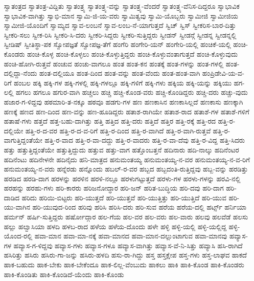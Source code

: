 {ಸ್ವಾತಂತ್ರದ
ಸ್ವಾತಂತ್ರ-ವಿದ್ದಿತು
ಸ್ವಾತಂತ್ರ್ಯ
ಸ್ವಾತಂತ್ರ್ಯ-ವನ್ನು
ಸ್ವಾತಂತ್ರ್ಯ-ವೆಂದರೆ
ಸ್ವಾತಂತ್ರ್ಯ-ವೆನಿಸ-ದಿದ್ದರೂ
ಸ್ವಾಭಾವಿಕ
ಸ್ವಾಭಾವಿಕ-ವಾಗಿತ್ತು
ಸ್ವಾಭಿ-ಮಾನ
ಸ್ವಾಮಿ-ಜಿ-ಯ-ವರು
ಸ್ವಾಮಿತ್ವವು
ಸ್ವಾಮಿ-ಯೊಬ್ಬರು
ಸ್ವಾಮೀಜಿ
ಸ್ವಾಮೀಜಿಯ
ಸ್ವಾಮೀಜಿ-ಯೊಂದಿಗೆ
ಸ್ವಾಮ್ಯದ
ಸ್ವಾವ-ಲಂಬನೆ
ಸ್ವಾವ-ಲಂಬ-ನೆ-ಯಾಗುತ್ತದೆ
ಸ್ವಿಚ್
ಸ್ವಿಸ್
ಸ್ವೀಕರಿಸ-ಬಾರ-ದಿತ್ತು
ಸ್ವೀಕರಿ-ಸಲು
ಸ್ವೀಕ-ರಿಸಿ
ಸ್ವೀಕರಿ-ಸಿ-ದರು
ಸ್ವೀಕರಿ-ಸಿದ್ದರು
ಸ್ವೀಕರಿ-ಸುತ್ತಿದ್ದರು
ಸ್ವೀಡನ್
ಸ್ವೀಡನ್ಗೆ
ಸ್ವೀಡನ್ನ
ಸ್ವೀಡನ್ನಲ್ಲಿ
ಸ್ವೀಡಿಷ್
ಸ್ವೀತಿಸ್ಥಾ-ಪಕ
ಸ್ವೋಪಜ್ಞತೆ
ಸ್ವೋಪಜ್ಞ-ತೆಗೆ
ಹಂಗೆರಿ
ಹಂಗೇರಿ-ಯನ್
ಹಂಗೇರಿ-ಯಲ್ಲಿ
ಹಂಚಿಕೆ-ಯಲ್ಲಿ
ಹಂಚಿ-ಕೊಂಡರು
ಹಂಚಿ-ಕೊಳ್ಳ
ಹಂಚಿ-ಕೊಳ್ಳಲು
ಹಂಚಿ-ಕೊಳ್ಳುತ್ತಿದ್ದರು
ಹಂಚಿ-ಕೊಳ್ಳುವಂತಾಗುತ್ತದೆ
ಹಂಚಿ-ಕೊಳ್ಳುವುದು
ಹಂಚಿ-ಹೋಗಿ-ರುತ್ತವೆ
ಹಂಚುವ
ಹಂಚು-ವಾಗಲೂ
ಹಂತ
ಹಂತ-ಕನ
ಹಂತಕ್ಕೆ
ಹಂತ-ಗಳನ್ನು
ಹಂತ-ಗಳಲ್ಲಿ
ಹಂತ-ದಲ್ಲಿದ್ದಾ-ನೆಂದು
ಹಂತ-ದಲ್ಲಿಯೂ
ಹಂತ-ದಿಂದ
ಹಂತ-ವನ್ನು
ಹಂತ-ವೆಂದು
ಹಂತ-ಹಂತ-ವಾಗಿ
ಹಂಪ್ರಿಡೇವಿ-ಯ-ವ-ರಿಗೆ
ಹಂಬಲ
ಹಕ್ಕಿ
ಹಕ್ಕಿ-ಗಳ
ಹಕ್ಕಿ-ಗಳಲ್ಲಿ
ಹಕ್ಕಿ-ಗಳಲ್ಲೂ
ಹಕ್ಕಿ-ಗಳಿಗೆ
ಹಕ್ಕಿ-ಗಳು
ಹಕ್ಕಿಯ
ಹಕ್ಕಿ-ಯನ್ನು
ಹಕ್ಕಿಯು
ಹಗ-ಲಲ್ಲಿ
ಹಗಲು
ಹಗಲೂ
ಹಗುರ-ವಾಗಿ
ಹಚ್ಚಲು
ಹಚ್ಚಿ
ಹಚ್ಚಿ-ಕೊಂಡ-ವರು
ಹಚ್ಚಿ-ಕೊಂಡಿದ್ದರು
ಹಚ್ಚಿ-ದರು
ಹಚ್ಚು-ವುದು
ಹಜಾರ-ಗ-ಳಿದ್ದವು
ಹಠಮಾರಿ-ತ-ನಕ್ಕೂ
ಹಠವೂ
ಹಡಗು-ಗಳ
ಹಣ
ಹಣಕಾಸಿನ
ಹಣಕಾಸಿಲ್ಲದೆ
ಹಣಕಾಸು
ಹಣಕ್ಕಾಗಿ
ಹಣಕ್ಕೆ
ಹಣದ
ಹಣ-ದಿಂದ
ಹಣ-ವನ್ನು
ಹಣ-ಹೂಡಿದ್ದರು
ಹತಾಶ-ರಾಗಿಯೇ
ಹತಾಶ-ರಾದ
ಹತಾಶೆ-ಗಳ
ಹತಾಶೆ-ಗಳಿಗೆ
ಹತಾಷೆ-ಗಳು
ಹತ್ತದೆ
ಹತ್ತ-ಬಹು-ದಾಗಿತ್ತು
ಹತ್ತಿ
ಹತ್ತಿದ
ಹತ್ತಿ-ದರು
ಹತ್ತಿದೆ
ಹತ್ತಿರ
ಹತ್ತಿ-ರಕ್ಕೆ
ಹತ್ತಿ-ರದ
ಹತ್ತಿ-ರ-ದಲ್ಲಿಯೇ
ಹತ್ತಿ-ರ-ದ-ವರ
ಹತ್ತಿ-ರ-ದ-ವ-ರಿಗೆ
ಹತ್ತಿ-ರ-ದಿಂದ
ಹತ್ತಿ-ರ-ವಾಗಿದೆ
ಹತ್ತಿ-ರ-ವಾಗಿ-ರುತ್ತವೆ
ಹತ್ತಿ-ರ-ವಾಗುತ್ತಿದ್ದಂತೆಯೇ
ಹತ್ತಿ-ರ-ವಾದ
ಹತ್ತಿ-ರ-ವಾ-ದದ್ದು
ಹತ್ತಿ-ರ-ವಾದರು
ಹತ್ತಿ-ರ-ವಾ-ದೆವು
ಹತ್ತಿ-ರ-ವಿದ್ದ
ಹತ್ತಿ-ಸಿದರು
ಹತ್ತು
ಹತ್ತುತ್ತಿದ್ದಂತೆಯೇ
ಹತ್ತುತ್ತಿದ್ದುದು
ಹತ್ತುವ
ಹತ್ತು-ವಾಗ
ಹತ್ತೊಂಬತ್ತನೆ
ಹದಿನಾರು
ಹದಿ-ನಾಲ್ಕು
ಹದಿನೆಂಟರ
ಹದಿನೆಂಟು
ಹದಿನೇಳನೇ
ಹದಿನೈದು
ಹನಿ-ಮಾತ್ರದ
ಹನುಮಂತಯ್ಯ
ಹನುಮಂತಯ್ಯ-ನ-ವರ
ಹನುಮಂತಯ್ಯ-ನ-ವ-ರಿಗೆ
ಹನುಮಂತಯ್ಯ-ನ-ವರು
ಹನ್ನೆರಡು
ಹನ್ನೊಂದು
ಹಬಲ್-ರ-ವರ
ಹಬ್ಬದ
ಹಬ್ಬದಂತಿ-ರುತ್ತಿದ್ದವು
ಹಬ್ಬ-ವನ್ನು
ಹರಡಿತ್ತು
ಹರಡಿದ
ಹರಡಿ-ದಾಗ
ಹರಳನ್ನು
ಹರಳಿನ
ಹರಳಿ-ನಲ್ಲೂ
ಹರಳುಗಟ್ಟುತ್ತದೆ
ಹರಳು-ಗಳ
ಹರಳು-ಗಳನ್ನು
ಹರವಿ-ನಲ್ಲಿ
ಹರಹನ್ನು
ಹರಹು-ಗಳು
ಹರಿ-ಕಾರರು
ಹರಿಜನೋದ್ಧಾರ
ಹರಿ-ಜನ್
ಹರಿತ-ಬುದ್ಧಿಯ
ಹರಿ-ದವು
ಹರಿ-ದಾಗ
ಹರಿ-ದಾಡಿದ
ಹರಿದು
ಹರಿಯಿ-ಬಿಟ್ಟರು
ಹರಿ-ಯುತ್ತದೆ
ಹರಿ-ಯುತ್ತವೆ
ಹರಿ-ಯುತ್ತಿತ್ತು
ಹರಿ-ಯುತ್ತಿದೆ
ಹರಿ-ಯುವ
ಹರಿ-ಯು-ವಾಗಿನ
ಹರಿ-ಯುವುದ-ರಿಂದ
ಹರಿವು
ಹರಿಸಿ
ಹರಿಸಿ-ದರು
ಹರಿ-ಸುವ
ಹರೆಯ
ಹರೆಯ-ದಲ್ಲಿ
ಹರ್ಟ್ಸ್
ಹರ್ನಿಯಾ
ಹರ್ಮನ್
ಹರ್ಷಿ-ಸುತ್ತಿದ್ದರು
ಹರ್ಷೋದ್ಗಾರ
ಹಲ-ಗೆಯ
ಹಲ-ವರ
ಹಲ-ವರು
ಹಲ-ವಾರು
ಹಲವು
ಹಲವೆಡೆ
ಹಲಸು
ಹಲ್ಲು
ಹಲ್ವಾಸಿಯಾ
ಹಳದಿ
ಹಳಬ-ರಾದ
ಹಳೆಯ
ಹಳೆಯ-ದೊಂದು
ಹಳೇ
ಹಳ್ಳಿ
ಹಳ್ಳಿ-ಯಲ್ಲಿ
ಹಳ್ಳಿ-ಯಲ್ಲಿದ್ದ
ಹಳ್ಳಿ-ಯೊಂದ-ರಲ್ಲಿ
ಹವಾ-ಮಾನ
ಹವಾ-ಮಾ-ನಕ್ಕೆ
ಹವಾ-ಮಾನದ
ಹವಾ-ಮಾನ-ದಲ್ಲುಂಟಾಗುವ
ಹವಾ-ಮಾನವು
ಹವ್ಯಾಸ-ಗಳ
ಹವ್ಯಾಸ-ಗ-ಳಿದ್ದವು
ಹವ್ಯಾಸ-ಗಳು
ಹವ್ಯಾಸ-ಗಳೂ
ಹವ್ಯಾಸ-ವಾಗಿತ್ತು
ಹವ್ಯಾಸ-ವೆ-ನಿ-ಸಿತ್ತು
ಹವ್ಯಾಸಿ
ಹಸಿ-ರಾಗಿದೆ
ಹಸಿರಿತ್ತು
ಹಸಿರು
ಹಸಿರು-ಗಾ-ಜನ್ನು
ಹಸಿರು-ಹಳದಿ
ಹಸು-ರಾ-ಗಿದ್ದು
ಹಸ್ತ
ಹಸ್ತಕ್ಷೇಪ
ಹಸ್ತ-ಗಳು
ಹಸ್ತ-ಲಾಘವ
ಹಾಕದೆ
ಹಾಕ-ಬಹುದು
ಹಾಕ-ಬೇಕು
ಹಾಕ-ಬೇಕೆಂದೂ
ಹಾಕ-ಲಿಲ್ಲ-ವೆಂಬುದು
ಹಾಕಲು
ಹಾಕಿ
ಹಾಕಿ-ಕೊಂಡ
ಹಾಕಿ-ಕೊಂಡರು
ಹಾಕಿ-ಕೊಂಡಿತು
ಹಾಕಿ-ಕೊಂಡಿದೆ-ಯೆಂದು
ಹಾಕಿ-ಕೊಂಡು
}
